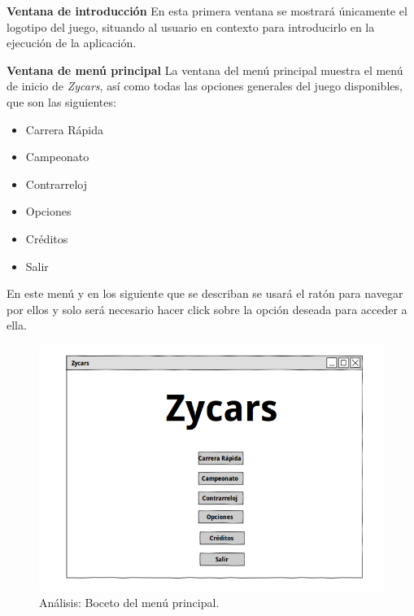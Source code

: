 \begin{description}
    \item \textbf{Ventana de introducción} En esta primera ventana se mostrará únicamente el logotipo del juego, situando al usuario en
    contexto para introducirlo en la ejecución de la aplicación.
    
    \item \textbf{Ventana de menú principal} La ventana del menú principal
    muestra el menú de inicio de \emph{Zycars}, así como 
    todas las opciones generales del juego disponibles, que son las siguientes:
        \begin{itemize}
            \item Carrera Rápida
            \item Campeonato
            \item Contrarreloj
            \item Opciones
            \item Créditos
            \item Salir
        \end{itemize}
        En este menú y en los siguiente que se describan se usará el ratón para navegar por ellos y solo será necesario
        hacer click sobre la opción deseada para acceder a ella.
    
        \begin{figure}[H]
          \label{diagrama_casos_uso}
          \begin{center}
            \includegraphics[scale=0.42]{imagenes/analisis/boceto_menu_principal.png}
          \end{center}
          \caption{Análisis: Boceto del menú principal.}
        \end{figure}
    

\end{description}
